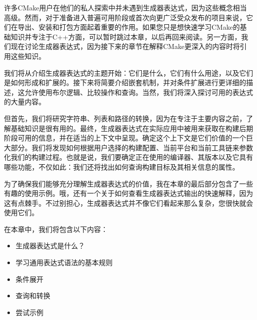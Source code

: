许多CMake用户在他们的私人探索中并未遇到生成器表达式，因为这些概念相当高级。然而，对于准备进入普遍可用阶段或首次向更广泛受众发布的项目来说，它们在导出、安装和打包方面起着重要的作用。如果您只是想快速学习CMake的基础知识并专注于C++方面，可以暂时跳过本章，以后再回来阅读。另一方面，我们现在讨论生成器表达式，因为接下来的章节在解释CMake更深入的内容时将引用这些知识。

我们将从介绍生成器表达式的主题开始：它们是什么，它们有什么用途，以及它们是如何形成和扩展的。接下来将简要介绍嵌套机制，并对条件扩展进行更详细的描述，这允许使用布尔逻辑、比较操作和查询。当然，我们将深入探讨可用的表达式的大量内容。

但首先，我们将研究字符串、列表和路径的转换，因为在专注于主要内容之前，了解基础知识是很有用的。最终，生成器表达式在实际应用中被用来获取在构建后期阶段可用的信息，并在适当的上下文中呈现。确定这个上下文是它们价值的一个巨大部分。我们将发现如何根据用户选择的构建配置、当前平台和当前工具链来参数化我们的构建过程。也就是说，我们要确定正在使用的编译器、其版本以及它具有哪些功能，不仅如此：我们还将找出如何查询构建目标及其相关信息的属性。

为了确保我们能够充分理解生成器表达式的价值，我在本章的最后部分包含了一些有趣的使用示例。哦，还有一个关于如何查看生成器表达式输出的快速解释，因为这有点棘手。不过别担心，生成器表达式并不像它们看起来那么复杂，您很快就会使用它们。

在本章中，我们将包含以下内容：

\begin{itemize}
\item
生成器表达式是什么？

\item
学习通用表达式语法的基本规则

\item
条件展开

\item
查询和转换

\item
尝试示例
\end{itemize}

































